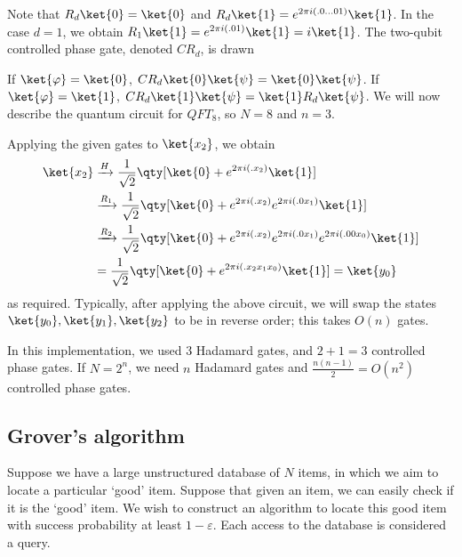 Note that $R_d \ket{0} = \ket{0}$ and $R_d \ket{1} = e^{2\pi i(.0\dots 01)} \ket{1}$.
In the case $d = 1$, we obtain $R_1 \ket{1} = e^{2 \pi i(.01)} \ket{1} = i \ket{1}$.
The two-qubit controlled phase gate, denoted $CR_d$, is drawn
\begin{center}
    \leavevmode
\end{center}
If $\ket{\varphi} = \ket{0}$, $CR_d\ket{0}\ket{\psi} = \ket{0}\ket{\psi}$.
If $\ket{\varphi} = \ket{1}$, $CR_d\ket{1}\ket{\psi} = \ket{1}R_d\ket{\psi}$.
We will now describe the quantum circuit for $QFT_8$, so $N = 8$ and $n = 3$.
\begin{center}
    \leavevmode
\end{center}
Applying the given gates to $\ket{x_2}$, we obtain
\begin{align*}
    \ket{x_2} &\xrightarrow{H} \frac{1}{\sqrt{2}}\qty[\ket{0} + e^{2\pi i (.x_2)} \ket{1}] \\
    &\xrightarrow{R_1} \frac{1}{\sqrt{2}}\qty[\ket{0} + e^{2\pi i (.x_2)} e^{2\pi i(.0x_1)} \ket{1}] \\
    &\xrightarrow{R_2} \frac{1}{\sqrt{2}}\qty[\ket{0} + e^{2\pi i(.x_2)} e^{2\pi i(.0x_1)} e^{2\pi i(.00x_0)} \ket{1}] \\
    &= \frac{1}{\sqrt{2}}\qty[\ket{0} + e^{2\pi i(.x_2 x_1 x_0)} \ket{1}] = \ket{y_0}
\end{align*}
as required.
Typically, after applying the above circuit, we will swap the states $\ket{y_0}, \ket{y_1}, \ket{y_2}$ to be in reverse order; this takes $O(n)$ gates.

In this implementation, we used 3 Hadamard gates, and $2 + 1 = 3$ controlled phase gates.
If $N = 2^n$, we need $n$ Hadamard gates and $\frac{n(n-1)}{2} = O(n^2)$ controlled phase gates.

\subsection{Grover's algorithm}
Suppose we have a large unstructured database of $N$ items, in which we aim to locate a particular `good' item.
Suppose that given an item, we can easily check if it is the `good' item.
We wish to construct an algorithm to locate this good item with success probability at least $1 - \varepsilon$.
Each access to the database is considered a query.


